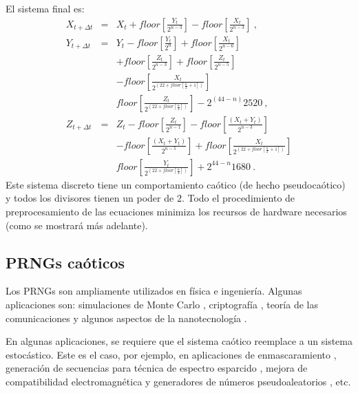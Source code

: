 El sistema final es:
%
\begin{eqnarray}\label{eq:Lorenz3}
{X}_{t+\Delta t}&=&{X}_{t}+floor\left[ {\frac{{Y}_{t}}{2^{{n-3}}}}
\right] -floor\left[{\frac{{X}_{t}}{2^{{n-3}}}}\right] \ , \nonumber \\
{Y}_{t+\Delta t}&=&{Y}_{t}-floor\left[
{\frac{{Y}_{t}}{2^n}}\right]
+floor\left[{\frac{{X}_{t}}{2^{{n-6}}}}\right]\nonumber \\
&& +floor\left[ {\frac{{Z}_{t}}{2^{{n-3}}}}\right] +
floor\left[{\frac{{Z}_{t}}{2^{{n-5}}}}\right]\nonumber \\
&&-floor\left[ {\frac{{X}_{t}}{2^{( 22+floor\left[
			{\frac{n}{2}+1}\right] )}
	}}\right] \nonumber \\
	&& floor\left[ {\frac{{Z}_{t}}{2^{( 22+floor\left[
				{\frac{n}{2}}\right] )}}}\right] -2^{(44-n)}2520 \ , \\
	{Z}_{t+\Delta t}&=&{Z}_{t}-floor\left[
	{\frac{{Z}_{t}}{2^{n-1}}}\right] -floor\left[
	{\frac{({X}_{t}+{Y}_{t})}{2^{n-3}}}\right]\nonumber \\
	&& -floor\left[ {\frac{({X}_{t}+{Y}_{t})}{2^{n-5}}}\right]
	+floor\left[ {\frac{{X}_{t}}{2^{( 22+floor\left[
				{\frac{n}{2}+1}\right]
				)}}}\right] \nonumber \\
	&& floor\left[ {\frac{{Y}_{t}}{2^{( 22+floor\left[
				{\frac{n}{2}}\right] )}}}\right]+2^{44-n}1680 \ . \nonumber
	\end{eqnarray}
%
Este sistema discreto tiene un comportamiento caótico (de hecho pseudocaótico) y todos los divisores tienen un poder de $2$.
Todo el procedimiento de preprocesamiento de las ecuaciones minimiza los recursos de hardware necesarios (como se mostrará más adelante).

\subsection{PRNGs caóticos}
\label{sec:PRNG}

Los PRNGs son ampliamente utilizados en física e ingeniería.
Algunas aplicaciones son: simulaciones de Monte Carlo \cite{Mertens2004}, criptografía \cite{Carlisle2007}, teoría de las comunicaciones \cite{Kocarev2001} y algunos aspectos de la nanotecnología \cite{Popescu2000}.

En algunas aplicaciones, se requiere que el sistema caótico reemplace a un sistema estocástico.
Este es el caso, por ejemplo, en aplicaciones de enmascaramiento \cite{Fernandez2003}, generación de secuencias para técnica de espectro esparcido \cite{Setti2004, DeMicco2007B}, mejora de compatibilidad electromagnética \cite{Callegari2003A} y generadores de números pseudoaleatorios \cite {Kocarev2003, Larrondo2006 , DeMicco2009}, etc.

